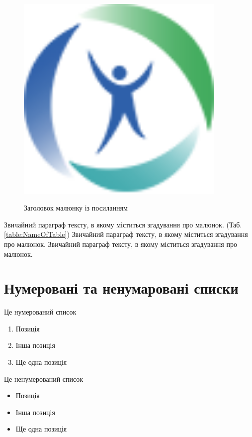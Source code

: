 \begin{figure}[h]
\caption{Заголовок малюнку із посиланням \cite{Chen2019}}
\centering
\includegraphics[width=0.9\textwidth]{Illustrations/Logo.png}
\label{fig:NameOfPicture} %
\end{figure}

Звичайний параграф тексту, в якому міститься згадування про малюнок. (Таб. \ref{table:NameOfTable}) %
Звичайний параграф тексту, в якому міститься згадування про малюнок. Звичайний параграф тексту, в якому міститься згадування про малюнок. 



\section{Нумеровані та ненумаровані списки}

Це нумерований список

\begin{enumerate}
    \item Позиція 
    \item Інша позиція
    \item Ще одна позиція
\end{enumerate}

\vspace{2em} %

Це ненумерований список

\begin{itemize}
    \item Позиція 
    \item Інша позиція
    \item Ще одна позиція
\end{itemize}
    